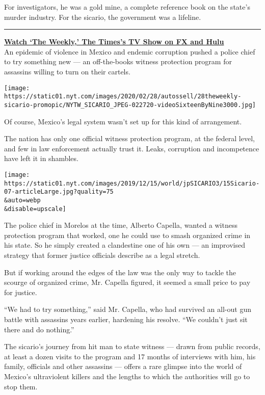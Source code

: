 For investigators, he was a gold mine, a complete reference book on the
state's murder industry. For the sicario, the government was a lifeline.

\begin{center}\rule{0.5\linewidth}{\linethickness}\end{center}

\textbf{\href{https://www.nytimes.com/2020/02/28/the-weekly/mexico-cartels-police.html}{Watch
`The Weekly,' The Times's TV Show on FX and Hulu}}\\
An epidemic of violence in Mexico and endemic corruption pushed a police
chief to try something new --- an off-the-books witness protection
program for assassins willing to turn on their cartels.

\texttt{[image: https://static01.nyt.com/images/2020/02/28/autossell/28theweekly-sicario-promopic/NYTW\_SICARIO\_JPEG-022720-videoSixteenByNine3000.jpg]}

Of course, Mexico's legal system wasn't set up for this kind of
arrangement.

The nation has only one official witness protection program, at the
federal level, and few in law enforcement actually trust it. Leaks,
corruption and incompetence have left it in shambles.

\texttt{[image: https://static01.nyt.com/images/2019/12/15/world/jpSICARIO3/15Sicario-07-articleLarge.jpg?quality=75\\\&auto=webp\\\&disable=upscale]}

The police chief in Morelos at the time, Alberto Capella, wanted a
witness protection program that worked, one he could use to smash
organized crime in his state. So he simply created a clandestine one of
his own --- an improvised strategy that former justice officials
describe as a legal stretch.

But if working around the edges of the law was the only way to tackle
the scourge of organized crime, Mr. Capella figured, it seemed a small
price to pay for justice.

``We had to try something,'' said Mr. Capella, who had survived an
all-out gun battle with assassins years earlier, hardening his resolve.
``We couldn't just sit there and do nothing.''

The sicario's journey from hit man to state witness --- drawn from
public records, at least a dozen visits to the program and 17 months of
interviews with him, his family, officials and other assassins ---
offers a rare glimpse into the world of Mexico's ultraviolent killers
and the lengths to which the authorities will go to stop them.

